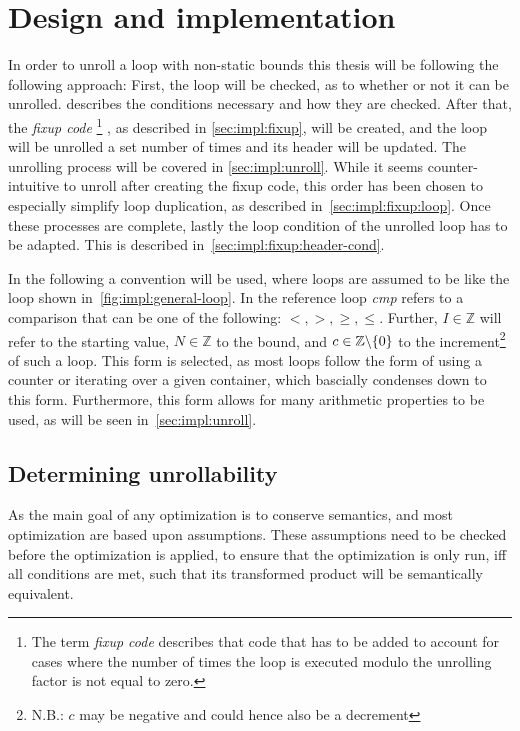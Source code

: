 \chapter{Design and implementation}\label{sec:impl}

In order to unroll a loop with non-static bounds this thesis will be following the following approach:
First, the loop will be checked, as to  whether or not it can be unrolled.
 describes the conditions necessary and how they are checked.
After that, the \textit{fixup code}
\footnote{The term \textit{fixup code} describes that code that has to be added to account for cases where the number of times the loop is executed modulo the unrolling factor is not equal to zero.}
, as described in \cref{sec:impl:fixup}, will be created, and the loop will be unrolled a set number of times and its header will be updated.
The unrolling process will be covered in \cref{sec:impl:unroll}.
While it seems counter-intuitive to unroll after creating the fixup code, this order has been chosen to especially simplify loop duplication, as described in~\cref{sec:impl:fixup:loop}.
Once these processes are complete, lastly the loop condition of the unrolled loop has to be adapted.
This is described in~\cref{sec:impl:fixup:header-cond}.

In the following a convention will be used, where loops are assumed to be like the loop shown in~\cref{fig:impl:general-loop}.
In the reference loop \textit{cmp} refers to a comparison that can be one of the following: $<, >, \geq, \leq$.
Further, $I \in \mathbb{Z}$ will refer to the starting value, $N \in \mathbb{Z}$ to the bound, and $c \in \mathbb{Z} \backslash \{0\}$ \label{sec:impl::def-c} to the increment\footnote{N.B.: $c$ may be negative and could hence also be a decrement} of such a loop.
This form is selected, as most loops follow the form of using a counter or iterating over a given container, which bascially condenses down to this form.
Furthermore, this form allows for many arithmetic properties to be used, as will be seen in~\cref{sec:impl:unroll}.



\section{Determining unrollability}\label{sec:impl:unrollability}

As the main goal of any optimization is to conserve semantics, and most optimization are based upon assumptions.
These assumptions need to be checked before the optimization is applied, to ensure that the optimization is only run, iff all conditions are met, such that its transformed product will be semantically equivalent.

